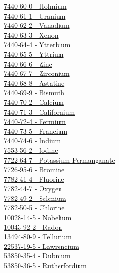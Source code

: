 \begin{multicols}{2}
\hyperref[sec:elem-holmium]{7440-60-0 - Holmium}\\
\hyperref[sec:elem-uranium]{7440-61-1 - Uranium}\\
\hyperref[sec:elem-vanadium]{7440-62-2 - Vanadium}\\
\hyperref[sec:elem-xenon]{7440-63-3 - Xenon}\\
\hyperref[sec:elem-ytterbium]{7440-64-4 - Ytterbium}\\
\hyperref[sec:elem-yttrium]{7440-65-5 - Yttrium}\\
\hyperref[sec:elem-zinc]{7440-66-6 - Zinc}\\
\hyperref[sec:elem-zirconium]{7440-67-7 - Zirconium}\\
\hyperref[sec:elem-astatine]{7440-68-8 - Astatine}\\
\hyperref[sec:elem-bismuth]{7440-69-9 - Bismuth}\\
\hyperref[sec:elem-calcium]{7440-70-2 - Calcium}\\
\hyperref[sec:elem-californium]{7440-71-3 - Californium}\\
\hyperref[sec:elem-fermium]{7440-72-4 - Fermium}\\
\hyperref[sec:elem-francium]{7440-73-5 - Francium}\\
\hyperref[sec:elem-indium]{7440-74-6 - Indium}\\
\hyperref[sec:elem-iodine]{7553-56-2 - Iodine}\\
\hyperref[sec:chem-7722-64-7]{7722-64-7 - Potassium Permanganate}\\
\hyperref[sec:elem-bromine]{7726-95-6 - Bromine}\\
\hyperref[sec:elem-fluorine]{7782-41-4 - Fluorine}\\
\hyperref[sec:elem-oxygen]{7782-44-7 - Oxygen}\\
\hyperref[sec:elem-selenium]{7782-49-2 - Selenium}\\
\hyperref[sec:elem-chlorine]{7782-50-5 - Chlorine}\\
\hyperref[sec:elem-nobelium]{10028-14-5 - Nobelium}\\
\hyperref[sec:elem-radon]{10043-92-2 - Radon}\\
\hyperref[sec:elem-tellurium]{13494-80-9 - Tellurium}\\
\hyperref[sec:elem-lawrencium]{22537-19-5 - Lawrencium}\\
\hyperref[sec:elem-dubnium]{53850-35-4 - Dubnium}\\
\hyperref[sec:elem-rutherfordium]{53850-36-5 - Rutherfordium}\\

\end{multicols}
